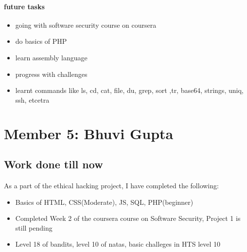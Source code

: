 \documentclass{article}
\begin{document}
\begin{itemize}
\begin{itemize}
\begin{itemize}
\paragraph{future tasks}
\begin{itemize}
    \item going with software security course on coursera
    \item do basics of PHP
    \item learn assembly language
    \item progress with challenges
\end{itemize}
\end{itemize}
\begin{itemize}
    \item learnt commands like ls, cd, cat, file, du, grep, sort ,tr, base64, strings, uniq, ssh, etcetra
\end{itemize}
    
\end{itemize}
\end{itemize}
\newpage
\section*{Member 5: Bhuvi Gupta}
\subsection*{Work done till now}
\paragraph{}
As a part of the ethical hacking project, I have completed the following:
\begin{itemize}
    \item Basics of HTML, CSS(Moderate), JS, SQL, PHP(beginner)
    \item Completed Week 2 of the coursera course on Software Security, Project 1 is still pending
    \item Level 18 of bandits, level 10 of natas, basic challeges in HTS level 10
\end{itemize}
\end{document}
